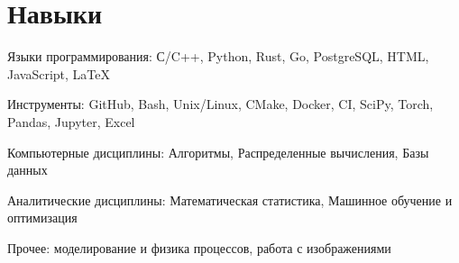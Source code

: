 \section{\textbf{Навыки}}
\resumeSubHeadingListStart

\resumePOR
{Языки программирования: }{С/C++, Python, Rust, Go, PostgreSQL, HTML, JavaScript, LaTeX}{}

\resumePOR
{Инструменты: }{GitHub, Bash, Unix/Linux, CMake, Docker, CI, SciPy, Torch, Pandas, Jupyter, Excel}{}

\resumePOR
{Компьютерные дисциплины: }{Алгоритмы, Распределенные вычисления, Базы данных}{}

\resumePOR
{Аналитические дисциплины: }{Математическая статистика, Машинное обучение и оптимизация}{}

\resumePOR
{Прочее: }{моделирование и физика процессов, работа с изображениями}{}


\resumeSubHeadingListEnd
